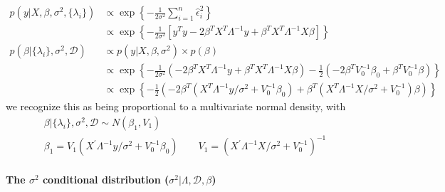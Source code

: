\documentclass[
]{article}
\begin{document}
\[
\begin{align}
p\left(y | X, \beta, \sigma^{2}, \{\lambda_i\}\right) 
&\propto \exp \left\{-\frac{1}{2 \sigma^{2}} \sum_{i=1}^{n} \hat\epsilon_i^2 \right\} \\
&\propto \exp \left\{-\frac{1}{2 \sigma^{2}}\left[y^{T} y-2 \beta^{T} X^{T}\Lambda^{-1} y+\beta^{T} X^{T}\Lambda^{-1} X \beta\right]\right\} \\
p\left(\beta | \{\lambda_i\}, \sigma^2, \mathcal{D}\right) &\propto p\left(y | X, \beta, \sigma^{2}\right) \times p(\beta) \\
&\propto \exp \left\{-\frac{1}{2\sigma^2}\left(-2 \beta^{T} X^{T}\Lambda^{-1} y +\beta^{T} X^{T}\Lambda^{-1} X \beta \right)-\frac{1}{2}\left(-2 \beta^{T} V_{0}^{-1} \beta_{0}+\beta^{T} V_{0}^{-1} \beta\right)\right\} \\
&\propto 
\exp \left\{-\frac{1}{2}\left(-2 \beta^{T} (X^{T}\Lambda^{-1} y/\sigma^2 +V_{0}^{-1} \beta_{0})+ \beta^{T} (X^{T}\Lambda^{-1} X/\sigma^2 +V_{0}^{-1} ) \beta \right)
\right\}
\end{align}
\] we recognize this as being proportional to a multivariate normal
density, with \[
\begin{align}
\beta | \{\lambda_i\}, \sigma^2, \mathcal{D} \sim N(\beta_1, V_1) \\
\beta_{1}=V_{1}\left(X^{\prime} \Lambda^{-1} y/\sigma^2+V_{0}^{-1} \beta_{0}\right) \qquad V_{1}=\left(X^{\prime} \Lambda^{-1} X / \sigma^{2}+V_{0}^{-1}\right)^{-1}
\end{align}
\]

\hypertarget{the-sigma2-conditional-distribution-sigma2-lambda-mathcald-beta}{%
\paragraph{\texorpdfstring{The \(\sigma^2\) conditional distribution
(\(\sigma^2| \Lambda, \mathcal{D}, \beta\))}{The \textbackslash sigma\^{}2 conditional distribution (\textbackslash sigma\^{}2\textbar{} \textbackslash Lambda, \textbackslash mathcal\{D\}, \textbackslash beta)}}\label{the-sigma2-conditional-distribution-sigma2-lambda-mathcald-beta}}
\end{document}
